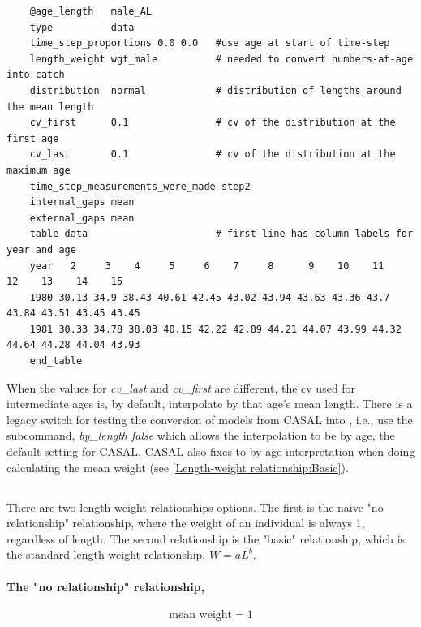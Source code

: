 {\small{\begin{verbatim}
	@age_length   male_AL
	type          data
	time_step_proportions 0.0 0.0   #use age at start of time-step
	length_weight wgt_male          # needed to convert numbers-at-age into catch
	distribution  normal            # distribution of lengths around the mean length
	cv_first      0.1               # cv of the distribution at the first age
	cv_last       0.1               # cv of the distribution at the maximum age
	time_step_measurements_were_made step2
	internal_gaps mean
	external_gaps mean
	table data                      # first line has column labels for year and age
	year   2     3    4     5     6    7     8      9    10    11    12    13    14    15
	1980 30.13 34.9 38.43 40.61 42.45 43.02 43.94 43.63 43.36 43.7 43.84 43.51 43.45 43.45
	1981 30.33 34.78 38.03 40.15 42.22 42.89 44.21 44.07 43.99 44.32 44.64 44.28 44.04 43.93
	end_table
\end{verbatim}}}

When the values for \textit{cv\_last} and \textit{cv\_first} are different, the cv used for intermediate ages is, by default, interpolate by that age's mean length. There is a legacy switch for testing the conversion of models from CASAL into \CNAME, i.e., use the subcommand, \textit{by\_length false} which allows the interpolation to be by age, the default setting for CASAL. CASAL also fixes to by-age interpretation when doing calculating the mean weight (see \ref{Length-weight relationship:Basic}).

\subsection{\label{sec:mean-weight}}

There are two length-weight relationships options. The first is the naive "no relationship" relationship, where the weight of an individual is always 1, regardless of length. The second relationship is the "basic" relationship, which is the standard length-weight relationship, $W = aL^b$.

\paragraph[None]{The "no relationship" relationship, }

  \begin{equation}
    \text{mean weight}=1
  \end{equation}

